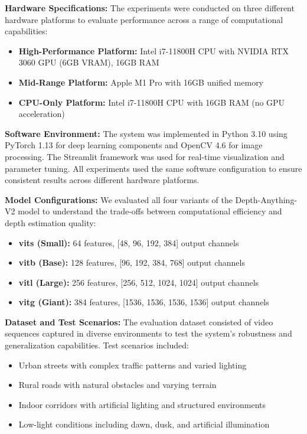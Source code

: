 \documentclass[conference]{IEEEtran}
\begin{document}
\textbf{Hardware Specifications:}
The experiments were conducted on three different hardware platforms to evaluate performance across a range of computational capabilities:
\begin{itemize}
\item \textbf{High-Performance Platform:} Intel i7-11800H CPU with NVIDIA RTX 3060 GPU (6GB VRAM), 16GB RAM
\item \textbf{Mid-Range Platform:} Apple M1 Pro with 16GB unified memory
\item \textbf{CPU-Only Platform:} Intel i7-11800H CPU with 16GB RAM (no GPU acceleration)
\end{itemize}

\textbf{Software Environment:}
The system was implemented in Python 3.10 using PyTorch 1.13 for deep learning components and OpenCV 4.6 for image processing. The Streamlit framework was used for real-time visualization and parameter tuning. All experiments used the same software configuration to ensure consistent results across different hardware platforms.

\textbf{Model Configurations:}
We evaluated all four variants of the Depth-Anything-V2 model to understand the trade-offs between computational efficiency and depth estimation quality:
\begin{itemize}
\item \textbf{vits (Small):} 64 features, [48, 96, 192, 384] output channels
\item \textbf{vitb (Base):} 128 features, [96, 192, 384, 768] output channels
\item \textbf{vitl (Large):} 256 features, [256, 512, 1024, 1024] output channels
\item \textbf{vitg (Giant):} 384 features, [1536, 1536, 1536, 1536] output channels
\end{itemize}

\textbf{Dataset and Test Scenarios:}
The evaluation dataset consisted of video sequences captured in diverse environments to test the system's robustness and generalization capabilities. Test scenarios included:
\begin{itemize}
\item Urban streets with complex traffic patterns and varied lighting
\item Rural roads with natural obstacles and varying terrain
\item Indoor corridors with artificial lighting and structured environments
\item Low-light conditions including dawn, dusk, and artificial illumination
\end{itemize}
\end{document}
